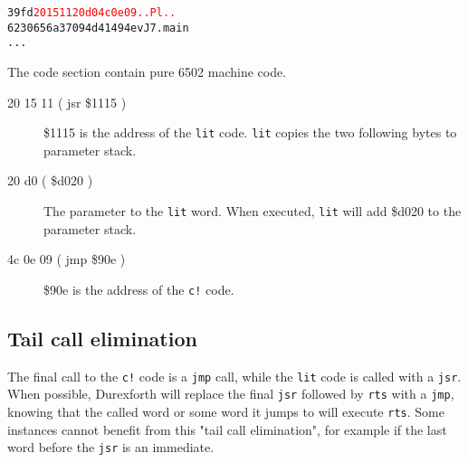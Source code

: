 \begin{alltt}
39fd  \textcolor{red}{20 15 11 20 d0 4c 0e 09  .. Pl..}
6230  65 6a 37 09 4d 41 49 4e vJ7.main
...
\end{alltt}

The code section contain pure 6502 machine code.

\begin{description}
\item[20 15 11 ( jsr \$1115 )] \$1115 is the address of the \texttt{lit} code. \texttt{lit} copies the two following bytes to parameter stack.
\item[20 d0 ( \$d020 )] The parameter to the \texttt{lit} word. When executed, \texttt{lit} will add \$d020 to the parameter stack.
\item[4c 0e 09 ( jmp \$90e )] \$90e is the address of the \texttt{c!} code.
\end{description}

\subsection{Tail call elimination}

The final call to the \texttt{c!} code is a \texttt{jmp} call, while the \texttt{lit} code is called with a \texttt{jsr}. When possible, Durexforth will replace the final \texttt{jsr} followed by \texttt{rts} with a \texttt{jmp}, knowing that the called word or some word it jumps to will execute \texttt{rts}. Some instances cannot benefit from this "tail call elimination", for example if the last word before the \texttt{jsr} is an immediate.

